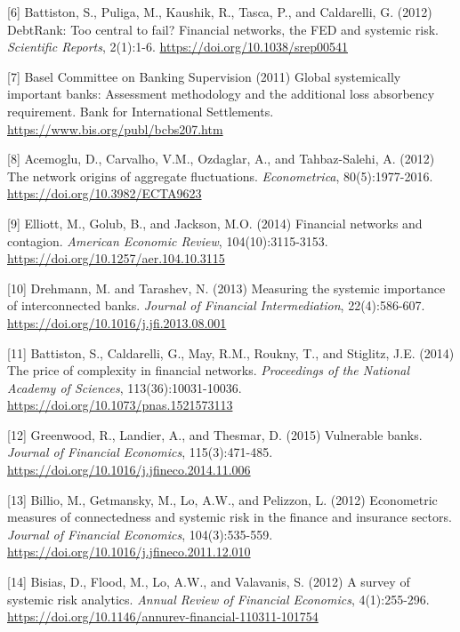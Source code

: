 \documentclass[a4 paper, 11pt,twoside]{article}
\newcommand{\0}{\Bf{0}}
\theoremstyle{definition}
\begin{document}
{\begin{thebibliography}{8}
{\label{ref6}[6] Battiston, S., Puliga, M., Kaushik, R., Tasca, P., and Caldarelli, G. (2012) DebtRank: Too central to fail? Financial networks, the FED and systemic risk. \emph{Scientific Reports}, 2(1):1-6. \href{https://doi.org/10.1038/srep00541}{https://doi.org/10.1038/srep00541}

\label{ref7}[7] Basel Committee on Banking Supervision (2011) Global systemically important banks: Assessment methodology and the additional loss absorbency requirement. Bank for International Settlements. \href{https://www.bis.org/publ/bcbs207.htm}{https://www.bis.org/publ/bcbs207.htm}

\label{ref8}[8] Acemoglu, D., Carvalho, V.M., Ozdaglar, A., and Tahbaz-Salehi, A. (2012) The network origins of aggregate fluctuations. \emph{Econometrica}, 80(5):1977-2016. \href{https://doi.org/10.3982/ECTA9623}{https://doi.org/10.3982/ECTA9623}

\label{ref9}[9] Elliott, M., Golub, B., and Jackson, M.O. (2014) Financial networks and contagion. \emph{American Economic Review}, 104(10):3115-3153. \href{https://doi.org/10.1257/aer.104.10.3115}{https://doi.org/10.1257/aer.104.10.3115}

\label{ref10}[10] Drehmann, M. and Tarashev, N. (2013) Measuring the systemic importance of interconnected banks. \emph{Journal of Financial Intermediation}, 22(4):586-607. \href{https://doi.org/10.1016/j.jfi.2013.08.001}{https://doi.org/10.1016/j.jfi.2013.08.001}

\label{ref11}[11] Battiston, S., Caldarelli, G., May, R.M., Roukny, T., and Stiglitz, J.E. (2014) The price of complexity in financial networks. \emph{Proceedings of the National Academy of Sciences}, 113(36):10031-10036. \href{https://doi.org/10.1073/pnas.1521573113}{https://doi.org/10.1073/pnas.1521573113}

\label{ref12}[12] Greenwood, R., Landier, A., and Thesmar, D. (2015) Vulnerable banks. \emph{Journal of Financial Economics}, 115(3):471-485. \href{https://doi.org/10.1016/j.jfineco.2014.11.006}{https://doi.org/10.1016/j.jfineco.2014.11.006}

\label{ref13}[13] Billio, M., Getmansky, M., Lo, A.W., and Pelizzon, L. (2012) Econometric measures of connectedness and systemic risk in the finance and insurance sectors. \emph{Journal of Financial Economics}, 104(3):535-559. \href{https://doi.org/10.1016/j.jfineco.2011.12.010}{https://doi.org/10.1016/j.jfineco.2011.12.010}


\label{ref14}[14] Bisias, D., Flood, M., Lo, A.W., and Valavanis, S. (2012) A survey of systemic risk analytics. \emph{Annual Review of Financial Economics}, 4(1):255-296. \href{https://doi.org/10.1146/annurev-financial-110311-101754}{https://doi.org/10.1146/annurev-financial-110311-101754}

}
\end{thebibliography}}
\end{document}

